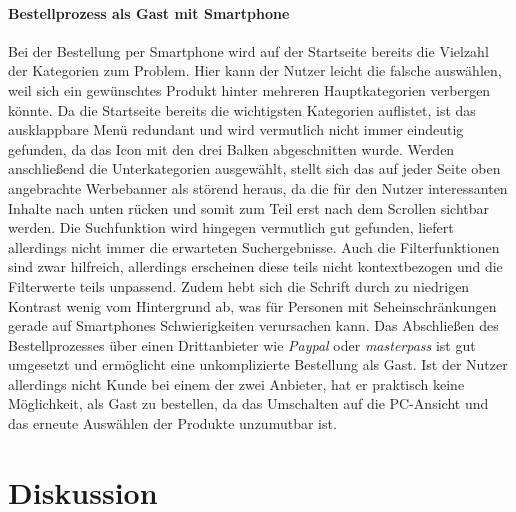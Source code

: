 \documentclass[	12pt, 
				a4paper, 
				BCOR=10mm, %
				DIV=12, 
				parskip=half, %
				headings=small, %
				twoside, %
				ngerman,
				bibliography=totoc,index=totoc, listof=totoc,
				numbers=noendperiod
				]{scrbook} %
\theoremstyle{plain}%
\theoremstyle{definition}
\theoremstyle{remark}
\begin{document}
\paragraph{Bestellprozess als Gast mit Smartphone} Bei der Bestellung per Smartphone wird auf der Startseite bereits die Vielzahl der Kategorien zum Problem. Hier kann der Nutzer leicht die falsche auswählen, weil sich ein gewünschtes Produkt hinter mehreren Hauptkategorien verbergen könnte. Da die Startseite bereits die wichtigsten Kategorien auflistet, ist das ausklappbare Menü redundant und wird vermutlich nicht immer eindeutig gefunden, da das Icon mit den drei Balken abgeschnitten wurde. Werden anschließend die Unterkategorien ausgewählt, stellt sich das auf jeder Seite oben angebrachte Werbebanner als störend heraus, da die für den Nutzer interessanten Inhalte nach unten rücken und somit zum Teil erst nach dem Scrollen sichtbar werden. Die Suchfunktion wird hingegen vermutlich gut gefunden, liefert allerdings nicht immer die erwarteten Suchergebnisse. Auch die Filterfunktionen sind zwar hilfreich, allerdings erscheinen diese teils nicht kontextbezogen und die Filterwerte teils unpassend. Zudem hebt sich die Schrift durch zu niedrigen Kontrast wenig vom Hintergrund ab, was für Personen mit Seheinschränkungen gerade auf Smartphones Schwierigkeiten verursachen kann. Das Abschließen des Bestellprozesses über einen Drittanbieter wie \textit{Paypal} oder \textit{masterpass} ist gut umgesetzt und ermöglicht eine unkomplizierte Bestellung als Gast. Ist der Nutzer allerdings nicht Kunde bei einem der zwei Anbieter, hat er praktisch keine Möglichkeit, als Gast zu bestellen, da das Umschalten auf die PC-Ansicht und das erneute Auswählen der Produkte unzumutbar ist.

\section{Diskussion}
\end{document}
